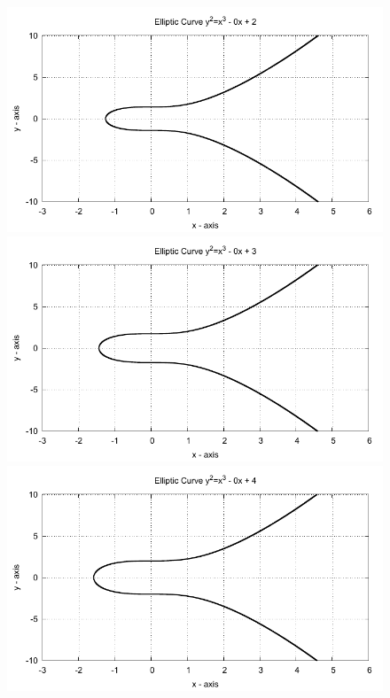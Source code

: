 \begin{figure}[!htbp]

  \begin{minipage}{0.3\textwidth} \centering
    \includegraphics{../Images/ecc_plot/4}
  \end{minipage}
  \begin{minipage}{0.3\textwidth} \centering
    \includegraphics{../Images/ecc_plot/5}
  \end{minipage}
  \begin{minipage}{0.3\textwidth} \centering
    \includegraphics{../Images/ecc_plot/6}
  \end{minipage}
\end{figure}

